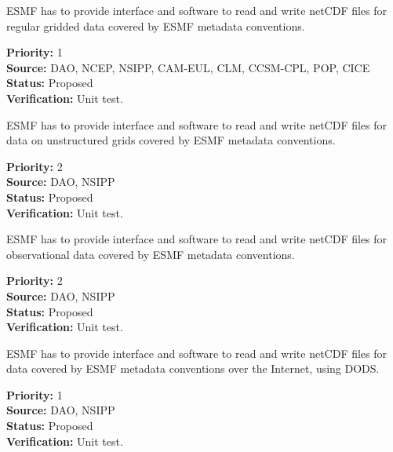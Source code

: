 ESMF has to provide interface and software to read and write netCDF
files for regular gridded data covered by ESMF metadata conventions. 

\begin{reqlist}
{\bf Priority:} 1 \\
{\bf Source:} DAO, NCEP, NSIPP, CAM-EUL, CLM, CCSM-CPL, POP, CICE \\
{\bf Status:} Proposed \\
{\bf Verification:} Unit test. \\
\end{reqlist}



ESMF has to provide interface and software to read and write netCDF
files for data on unstructured grids covered by ESMF metadata conventions. 

\begin{reqlist}
{\bf Priority:} 2 \\
{\bf Source:} DAO, NSIPP \\
{\bf Status:} Proposed \\
{\bf Verification:} Unit test. \\
\end{reqlist}



ESMF has to provide interface and software to read and write netCDF
files for observational data  covered by ESMF metadata conventions. 

\begin{reqlist}
{\bf Priority:} 2 \\
{\bf Source:} DAO, NSIPP \\
{\bf Status:} Proposed \\
{\bf Verification:} Unit test. \\
\end{reqlist}



ESMF has to provide interface and software to read and write netCDF
files for data covered by ESMF metadata conventions over the Internet, 
using DODS.

\begin{reqlist}
{\bf Priority:} 1 \\
{\bf Source:} DAO, NSIPP \\
{\bf Status:} Proposed \\
{\bf Verification:} Unit test. \\
\end{reqlist}

